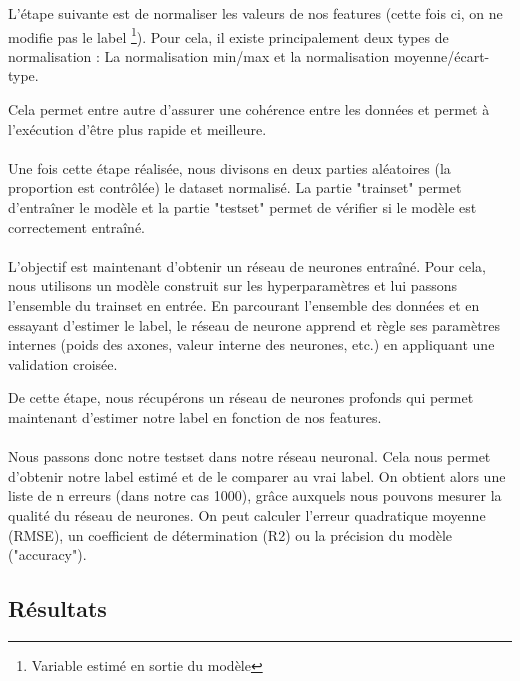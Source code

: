 L'étape suivante est de normaliser les valeurs de nos features (cette fois ci, on ne modifie pas le label \footnote{Variable estimé en sortie du modèle}). Pour cela, il existe principalement deux types de normalisation : La normalisation min/max et la normalisation moyenne/écart-type.

Cela permet entre autre d'assurer une cohérence entre les données et permet à l'exécution d'être plus rapide et meilleure.


\paragraph{}

Une fois cette étape réalisée, nous divisons en deux parties aléatoires (la proportion est contrôlée) le dataset normalisé. La partie "trainset" permet d'entraîner le modèle et la partie "testset" permet de vérifier si le modèle est correctement entraîné.

\paragraph{}

L'objectif est maintenant d'obtenir un réseau de neurones entraîné. Pour cela, nous utilisons un modèle construit sur les hyperparamètres et lui passons l'ensemble du trainset en entrée. En parcourant l'ensemble des données et en essayant d'estimer le label, le réseau de neurone apprend et règle ses paramètres internes (poids des axones, valeur interne des neurones, etc.) en appliquant une validation croisée.

De cette étape, nous récupérons un réseau de neurones profonds qui permet maintenant d'estimer notre label en fonction de nos features.


\paragraph{}

Nous passons donc notre testset dans notre réseau neuronal. Cela nous permet d'obtenir notre label estimé et de le comparer au vrai label. On obtient alors une liste de n erreurs (dans notre cas 1000), grâce auxquels nous pouvons mesurer la qualité du réseau de neurones. On peut calculer l'erreur quadratique moyenne (RMSE), un coefficient de détermination (R2) ou la précision du modèle ("accuracy").

\subsection{Résultats}

